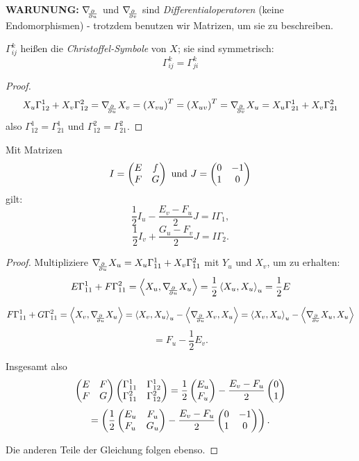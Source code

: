 	\begin{remark}
		\textbf{WARUNUNG:} $ \nabla_{\!\!{\partial\over \partial u}} $ und $ \nabla_{\!\!{\partial\over \partial v}} $ sind \emph{Differentialoperatoren} (keine Endomorphismen) - trotzdem benutzen wir Matrizen, um sie zu beschreiben.
	\end{remark}

\begin{lemma, definition}
	
	$\Gamma_{ij}^k$ heißen die \emph{Christoffel-Symbole} von $ X $; sie sind symmetrisch: 
		\[ \Gamma_{ij}^k = \Gamma_{ji}^k \]
	
\end{lemma, definition}

\begin{proof}
	
		\[ X_u\Gamma_{12}^1 + X_v \Gamma_{12}^2 = \nabla_{\!\!{\partial\over \partial u}}X_v = \left( X_{vu} \right)^T = \left( X_{uv} \right)^T = \nabla_{\!\!{\partial\over \partial v}}X_u = X_u\Gamma_{21}^1 + X_v\Gamma_{21}^2   \]
	also $ \Gamma_{12}^1 = \Gamma_{21}^1 $ und $ \Gamma_{12}^2 = \Gamma_{21}^2 $.
\end{proof}

\begin{theorem}
	
	Mit Matrizen 
		\[ I = \begin{pmatrix} E &f \\ F &G \end{pmatrix} \text{ und } J = \begin{pmatrix} 0 &-1 \\ 1 & 0  \end{pmatrix} \]
	gilt: 
		\[ \frac12 I_u - \frac{E_v - F_u}{2}J = I\Gamma_1, \]
		\[ \frac12 I_v + \frac{G_u - F_v}{2}J = I\Gamma_2. \]
		
\end{theorem}

\begin{proof}
	
	Multipliziere $ \nabla_{\!\!{\partial\over \partial u}}X_u = X_u\Gamma_{11}^1 + X_v\Gamma_{11}^2 $ mit $ Y_u $ und $ X_v $, um zu erhalten:
		\[ E \Gamma_{11}^1 + F \Gamma_{11}^2 = \left \langle X_u, \nabla_{\!\!{\partial\over \partial u}}X_u \right\rangle = \frac12 \left \langle X_u,X_u \right\rangle_u = \frac12 E \]
	
		\[ F\Gamma_{11}^1 + G \Gamma_{11}^2 = \left \langle X_v, \nabla_{\!\!{\partial\over \partial u}}X_u \right\rangle = \left \langle X_v,X_u \right\rangle_u - \left \langle \nabla_{\!\!{\partial\over \partial u}}X_v,X_u \right\rangle = \left \langle X_v,X_u \right\rangle_u - \left \langle \nabla_{\!\!{\partial\over \partial v}}X_u,X_u \right\rangle \]
		\[ = F_u - \frac12 E_v. \]
	
	Insgesamt also
		\[ \begin{pmatrix} E &F \\F &G \end{pmatrix} \begin{pmatrix} \Gamma_{11}^1 & \Gamma_{12}^1 \\ \Gamma_{11}^2 & \Gamma_{12}^2 \end{pmatrix} = \frac12 \begin{pmatrix} E_u \\ F_u \end{pmatrix} - \dfrac{E_v - F_u}{2} \begin{pmatrix} 0 \\ 1 \end{pmatrix} \]
		\[ = \left( \frac12 \begin{pmatrix} E_u & F_u \\ F_u & G_u \end{pmatrix} - \dfrac{E_v - F_u}{2} \begin{pmatrix} 0 &-1 \\ 1 & 0  \end{pmatrix} \right).  \]
	
	Die anderen Teile der Gleichung  folgen ebenso.
	
\end{proof}

